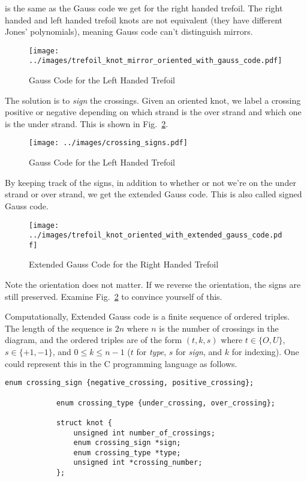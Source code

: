 \documentclass{article}
\theoremstyle{plain}
\begin{document}
        is the same as the Gauss code we get for the right handed trefoil.
        The right handed and left handed trefoil knots are not equivalent
        (they have different Jones' polynomials), meaning Gauss code can't
        distinguish mirrors.
        \begin{figure}
            \centering
            \texttt{[image: ../images/trefoil\_knot\_mirror\_oriented\_with\_gauss\_code.pdf]}
            \caption{Gauss Code for the Left Handed Trefoil}
            \label{fig:left_handed_trefoil_gauss_code}
        \end{figure}
        The solution is to \textit{sign} the crossings. Given an oriented knot,
        we label a crossing positive or negative depending on which strand is
        the over strand and which one is the under strand. This is shown in
        Fig.~\ref{fig:crossing_signs}.
        \begin{figure}
            \centering
            \texttt{[image: ../images/crossing\_signs.pdf]}
            \caption{Gauss Code for the Left Handed Trefoil}
            \label{fig:crossing_signs}
        \end{figure}
        By keeping track of the signs, in addition to whether or not we're on
        the under strand or over strand, we get the extended Gauss code. This
        is also called signed Gauss code.
        \begin{figure}
            \centering
            \texttt{[image: ../images/trefoil\_knot\_oriented\_with\_extended\_gauss\_code.pdf]}
            \caption{Extended Gauss Code for the Right Handed Trefoil}
            \label{fig:right_hand_trefoil_extended_gauss}
        \end{figure}
        Note the orientation does not matter. If we reverse the orientation,
        the signs are still preserved. Examine Fig.~\ref{fig:crossing_signs} to
        convince yourself of this.
        \par\hfill\par
        Computationally, Extended Gauss code is a finite sequence of ordered
        triples. The length of the sequence is $2n$ where $n$ is the number of
        crossings in the diagram, and the ordered triples are of the form
        $(t,k,s)$ where $t\in\{O,U\}$, $s\in\{+1,-1\}$, and
        $0\leq{k}\leq{n-1}$ ($t$ for \textit{type}, $s$ for \textit{sign}, and
        $k$ for indexing). One could represent this in the C programming
        language as follows.
        \begin{lstlisting}[style=CStyle, gobble=12]
            enum crossing_sign {negative_crossing, positive_crossing};

            enum crossing_type {under_crossing, over_crossing};

            struct knot {
                unsigned int number_of_crossings;
                enum crossing_sign *sign;
                enum crossing_type *type;
                unsigned int *crossing_number;
            };
        \end{lstlisting}
\end{document}
